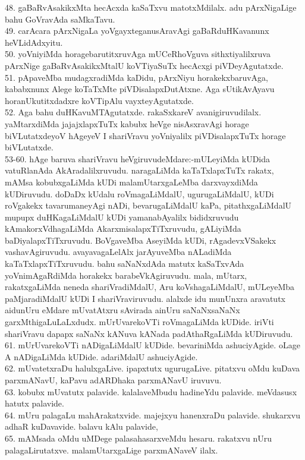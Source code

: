 \documentclass{article}
\begin{document}
48. gaBaRvAsakikxMta hecAcxda kaSaTxvu matotxMdilalx. adu pArxNigaLige bahu GoVravAda saMkaTavu.\\
49. carAcara pArxNigaLa yoVgayxteganusAravAgi gaBaRduHKavanunx heVLidAdxyitu.\\
50. yoVniyiMda horagebarutitxruvAga mUCeRhoVguva sithxtiyalilxruva pArxNige gaBaRvAsakikxMtalU koVTiyaSuTx hecAcxgi piVDeyAgutatxde.\\
51. pApaveMba mudagxradiMda kaDidu, pArxNiyu horakekxbaruvAga, kababxnunx Alege koTaTxMte piVDisalapxDutAtxne. Aga sUtikAvAyavu horanUkutitxdadxre koVTipAlu vayxteyAgutatxde.\\
52. Aga bahu duHKavuMTAgutatxde. rakaSxkareV avanigiruvudilalx. yaMtarxdiMda jajajxlapxTuTx kabubx heVge nisAsxravAgi horage biVLutatxdeyoV hAgeyeV I shariVravu yoVniyalilx piVDisalapxTuTx horage biVLutatxde.\\
53-60. hAge baruva shariVravu heVgiruvudeMdare:-mULeyiMda kUDida vatuRlanAda AkAradalilxruvudu. naragaLiMda kaTaTxlapxTuTx rakatx, mAMsa kobubxgaLiMda kUDi malamUtarxgaLeMba darxvayxdiMda kUDiruvudu. doDaDx kUdalu roVmagaLiMdalU, ugurugaLiMdalU, kUDi roVgakekx tavarumaneyAgi nADi, bevarugaLiMdalU kaPa, pitathxgaLiMdalU mupupx duHKagaLiMdalU kUDi yamanabAyalilx bididxruvudu kAmakorxVdhagaLiMda AkarxmisalapxTiTxruvudu, gALiyiMda baDiyalapxTiTxruvudu. BoVgaveMba AseyiMda kUDi, rAgadevxVSakekx vashavAgiruvudu. avayavagaLelAlx jarAyuveMba nALadiMda kaTaTxlapxTiTxruvudu. bahu saNaNxdAda matutx kaSaTxvAda yoVnimAgaRdiMda horakekx barabeVkAgiruvudu. mala, mUtarx, rakatxgaLiMda neneda shariVradiMdalU, Aru koVshagaLiMdalU, mULeyeMba paMjaradiMdalU kUDi I shariVraviruvudu. alalxde idu munUnxra aravatutx aidunUru eMdare mUvatAtxru sAvirada ainUru saNaNxsaNaNx garxMthigaLuLaLxdudx. mUrUvarekoVTi roVmagaLiMda kUDide. iriVti shariVravu dapapx saNaNx kANuva kANada padAthaRgaLiMda kUDiruvudu.\\
61. mUrUvarekoVTi nADigaLiMdalU kUDide. bevariniMda ashuciyAgide. oLage A nADigaLiMda kUDide. adariMdalU ashuciyAgide.\\
62. mUvatetxraDu halulxgaLive. ipapxtutx ugurugaLive. pitatxvu oMdu kuDava parxmANavU, kaPavu adARDhaka parxmANavU iruvuvu.\\
63. kobubx mUvatutx palavide. kalalaveMbudu hadineYdu palavide. meVdasusx hatutx palavide.\\
64. mUru palagaLu mahArakatxvide. majejxyu hanenxraDu palavide. shukarxvu adhaR kuDavavide. balavu kAlu palavide,\\
65. mAMsada oMdu uMDege palasahasarxveMdu hesaru. rakatxvu nUru palagaLirutatxve. malamUtarxgaLige parxmANaveV ilalx.\\
\end{document}

